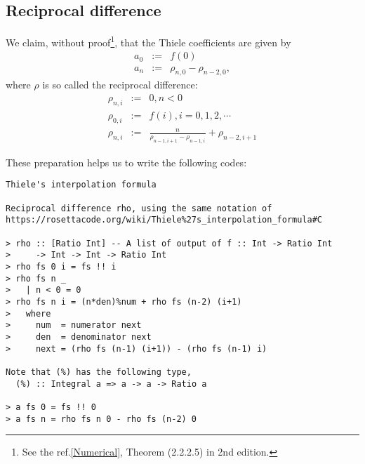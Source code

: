 \documentclass[11pt]{book}
\begin{document}
\subsection{Reciprocal difference}
We claim, without proof\footnote{
See the ref.\ref{Numerical}, Theorem (2.2.2.5) in 2nd edition.
}, that the Thiele coefficients are given by
\begin{eqnarray}
a_0 &:=& f(0) \\
a_n &:=& \rho_{n,0} - \rho_{{n-2},0},
\end{eqnarray}
where $\rho$ is so called the reciprocal difference:
\begin{eqnarray}
\rho_{n,i} &:=& 0, n<0 \\
\rho_{0,i} &:=& f(i), i=0,1,2,\cdots \\
\rho_{n,i} &:=& \frac{n}{\rho_{{n-1}, i+1} - \rho_{{n-1},i}} + \rho_{{n-2},i+1}
\end{eqnarray}

These preparation helps us to write the following codes:
\begin{verbatim}
Thiele's interpolation formula

Reciprocal difference rho, using the same notation of 
https://rosettacode.org/wiki/Thiele%27s_interpolation_formula#C

> rho :: [Ratio Int] -- A list of output of f :: Int -> Ratio Int
>     -> Int -> Int -> Ratio Int
> rho fs 0 i = fs !! i
> rho fs n _ 
>   | n < 0 = 0
> rho fs n i = (n*den)%num + rho fs (n-2) (i+1)
>   where
>     num  = numerator next
>     den  = denominator next
>     next = (rho fs (n-1) (i+1)) - (rho fs (n-1) i)

Note that (%) has the following type,
  (%) :: Integral a => a -> a -> Ratio a

> a fs 0 = fs !! 0
> a fs n = rho fs n 0 - rho fs (n-2) 0
\end{verbatim}
\end{document}
